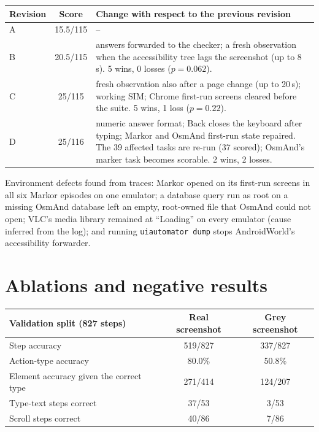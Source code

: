 \documentclass{article}
\begin{document}
\begin{table}[h]
\centering
\small
\begin{tabular}{@{}l c L{11.0cm}@{}}
\toprule
Revision & Score & Change with respect to the previous revision \\
\midrule
A & 15.5/115 & -- \\
B & 20.5/115 & answers forwarded to the checker; a fresh observation when the accessibility tree lags the screenshot (up to 8\,s). 5 wins, 0 losses ($p = 0.062$). \\
C & 25/115 & fresh observation also after a page change (up to 20\,s); working SIM; Chrome first-run screens cleared before the suite. 5 wins, 1 loss ($p = 0.22$). \\
D & 25/116 & numeric answer format; Back closes the keyboard after typing; Markor and OsmAnd first-run state repaired. The 39 affected tasks are re-run (37 scored); OsmAnd's marker task becomes scorable. 2 wins, 2 losses. \\
\bottomrule
\end{tabular}
\end{table}

Environment defects found from traces: Markor opened on its first-run screens in all six Markor episodes on one
emulator; a database query run as root on a missing OsmAnd database left an empty, root-owned file that OsmAnd
could not open; VLC's media library remained at ``Loading'' on every emulator (cause inferred from the log); and
running \texttt{uiautomator dump} stops AndroidWorld's accessibility forwarder.

\section{Ablations and negative results}
\label{app:ablation}

\begin{table}[h]
\centering
\small
\begin{tabular}{@{}l c c@{}}
\toprule
Validation split (827 steps) & Real screenshot & Grey screenshot \\
\midrule
Step accuracy & 519/827 & 337/827 \\
Action-type accuracy & 80.0\% & 50.8\% \\
Element accuracy given the correct type & 271/414 & 124/207 \\
Type-text steps correct & 37/53 & 3/53 \\
Scroll steps correct & 40/86 & 7/86 \\
\bottomrule
\end{tabular}
\end{table}
\end{document}
